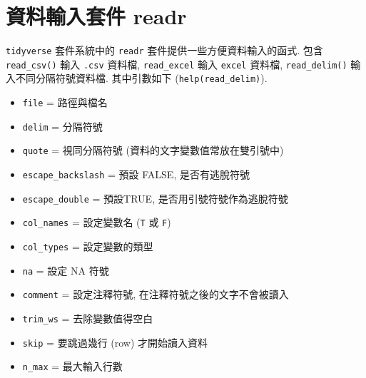 \documentclass[
]{book}
\providecommand{\tightlist}{%
  \setlength{\itemsep}{0pt}\setlength{\parskip}{0pt}}
\begin{document}
\hypertarget{ux8cc7ux6599ux8f38ux5165ux5957ux4ef6-readr}{%
\section{資料輸入套件 readr}\label{ux8cc7ux6599ux8f38ux5165ux5957ux4ef6-readr}}

\texttt{tidyverse} 套件系統中的 \texttt{readr} 套件提供一些方便資料輸入的函式.
包含
\texttt{read\_csv()} 輸入 \texttt{.csv} 資料檔,
\texttt{read\_excel} 輸入 \texttt{excel} 資料檔,
\texttt{read\_delim()} 輸入不同分隔符號資料檔.
其中引數如下 (\texttt{help(read\_delim)}).

\begin{itemize}
\tightlist
\item
  \texttt{file} = 路徑與檔名
\item
  \texttt{delim} = 分隔符號
\item
  \texttt{quote} = 視同分隔符號 (資料的文字變數值常放在雙引號中)
\item
  \texttt{escape\_backslash} = 預設 FALSE, 是否有逃脫符號
\item
  \texttt{escape\_double} = 預設TRUE, 是否用引號符號作為逃脫符號
\item
  \texttt{col\_names} = 設定變數名 (\texttt{T} 或 \texttt{F})
\item
  \texttt{col\_types} = 設定變數的類型
\item
  \texttt{na} = 設定 NA 符號
\item
  \texttt{comment} = 設定注釋符號, 在注釋符號之後的文字不會被讀入
\item
  \texttt{trim\_ws} = 去除變數值得空白
\item
  \texttt{skip} = 要跳過幾行 (row) 才開始讀入資料
\item
  \texttt{n\_max} = 最大輸入行數
\end{itemize}
\end{document}
